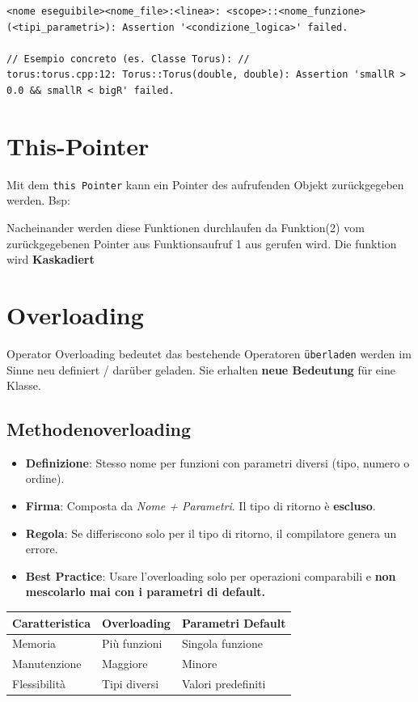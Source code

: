 \begin{lstlisting}
<nome eseguibile><nome_file>:<linea>: <scope>::<nome_funzione>(<tipi_parametri>): Assertion '<condizione_logica>' failed.

// Esempio concreto (es. Classe Torus): // 
torus:torus.cpp:12: Torus::Torus(double, double): Assertion 'smallR > 0.0 && smallR < bigR' failed.
\end{lstlisting}

\section{This-Pointer}

Mit dem \texttt{this Pointer} kann ein Pointer des aufrufenden Objekt zurückgegeben werden. Bsp:



Nacheinander werden diese Funktionen durchlaufen da Funktion(2) vom zurückgegebenen Pointer aus Funktionsaufruf 1 aus gerufen wird.
Die funktion wird \textbf{Kaskadiert}


\section{Overloading}

Operator Overloading bedeutet das bestehende Operatoren \texttt{überladen} werden im Sinne neu definiert / darüber geladen. 
Sie erhalten \textbf{neue Bedeutung} für eine Klasse.


\subsection{Methodenoverloading}
\begin{itemize}
    \item \textbf{Definizione}: Stesso nome per funzioni con parametri diversi (tipo, numero o ordine).
    \item \textbf{Firma}: Composta da \textit{Nome + Parametri}. Il tipo di ritorno è \textbf{escluso}.
    \item \textbf{Regola}: Se differiscono solo per il tipo di ritorno, il compilatore genera un errore.
    \item \textbf{Best Practice}: Usare l'overloading solo per operazioni comparabili e \textbf{non mescolarlo mai con i parametri di default.}
\end{itemize}

\begin{center}
    
    \begin{tabular}{lll}
        \toprule
        \textbf{Caratteristica} & \textbf{Overloading} & \textbf{Parametri Default} \\
        \midrule
        Memoria & Più funzioni & Singola funzione \\
        Manutenzione & Maggiore & Minore \\
        Flessibilità & Tipi diversi & Valori predefiniti \\
        \bottomrule
    \end{tabular}
\end{center}

